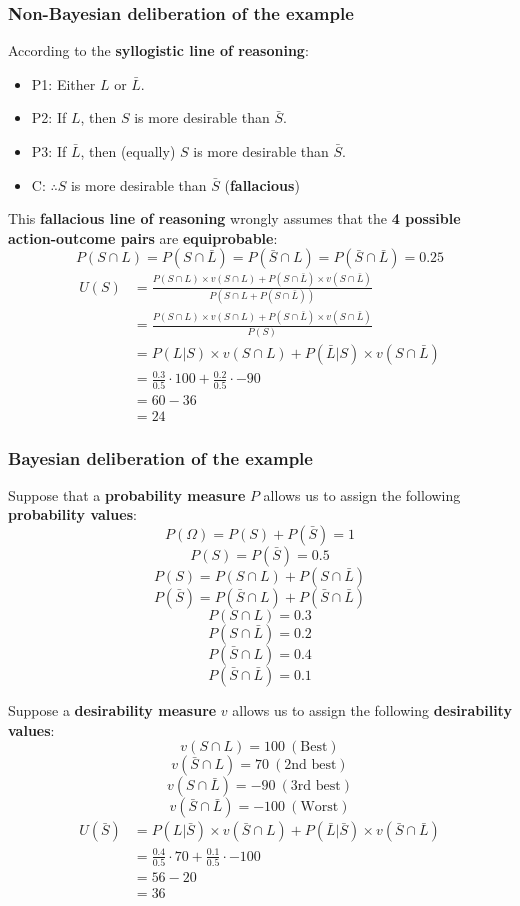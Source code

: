 \documentclass[11pt]{article}
\begin{document}
\subsubsection{Non-Bayesian deliberation of the example}
\label{sec:org9c793ad}
According to the \textbf{syllogistic line of reasoning}:
\begin{itemize}
\item P1: Either \(L\) or \(\bar{L}\).
\item P2: If \(L\), then \(S\) is more desirable than \(\bar{S}\).
\item P3: If \(\bar{L}\), then (equally) \(S\) is more desirable than \(\bar{S}\).
\item C: \(\therefore S\) is more desirable than \(\bar{S}\) (\textbf{fallacious})
\end{itemize}

This \textbf{fallacious line of reasoning} wrongly assumes that the \textbf{4 possible action-outcome pairs} are \textbf{equiprobable}:
\[P(S \cap L) = P(S \cap \bar{L}) = P(\bar{S} \cap L) = P (\bar{S} \cap \bar{L}) = 0.25\]
\begin{align*}
U(S) &= \frac{P(S \cap L) \times v(S \cap L) + P(S \cap \bar{L}) \times v(S \cap \bar{L})}{P(S \cap L + P(S \cap \bar{L}))} \\
&= \frac{P(S \cap L) \times v(S \cap L) + P(S \cap \bar{L}) \times v(S \cap \bar{L})}{P(S)} \\
&= P(L | S) \times v (S \cap L) + P(\bar{L} | S) \times v(S \cap \bar{L}) \\
&= \frac{0.3}{0.5} \cdot 100 + \frac{0.2}{0.5} \cdot -90 \\
&= 60 - 36 \\
&= 24
\end{align*}

 \newpage
\subsubsection{Bayesian deliberation of the example}
\label{sec:org5e2ade7}
Suppose that a \textbf{probability measure} \(P\) allows us to assign the following \textbf{probability values}:
\[P(\Omega) = P(S) + P(\bar{S}) = 1\]
\[P(S) = P(\bar{S}) = 0.5\]
\[P(S) = P(S \cap L) + P(S \cap \bar{L})\]
\[P(\bar{S}) = P(\bar{S} \cap L) + P(\bar{S} \cap \bar{L})\]
\[P(S \cap L) = 0.3\]
\[P(S \cap \bar{L}) = 0.2\]
\[P(\bar{S} \cap L) = 0.4\]
\[P(\bar{S} \cap \bar{L}) = 0.1\]

Suppose a \textbf{desirability measure} \(v\) allows us to assign the following \textbf{desirability values}:
\[v(S \cap L) = 100 \ (\text{Best})\]
\[v(\bar{S} \cap L) = 70 \ (\text{2nd best})\]
\[v(S \cap \bar{L}) = -90 \ (\text{3rd best})\]
\[v(\bar{S} \cap \bar{L}) = -100 \ (\text{Worst})\]
\begin{align*}
U(\bar{S}) &= P(L | \bar{S}) \times v(\bar{S} \cap L) + P (\bar{L} | \bar{S}) \times v(\bar{S} \cap \bar{L}) \\
&= \frac{0.4}{0.5} \cdot 70 + \frac{0.1}{0.5} \cdot -100 \\
&= 56 - 20 \\
&= 36
\end{align*}
\end{document}

